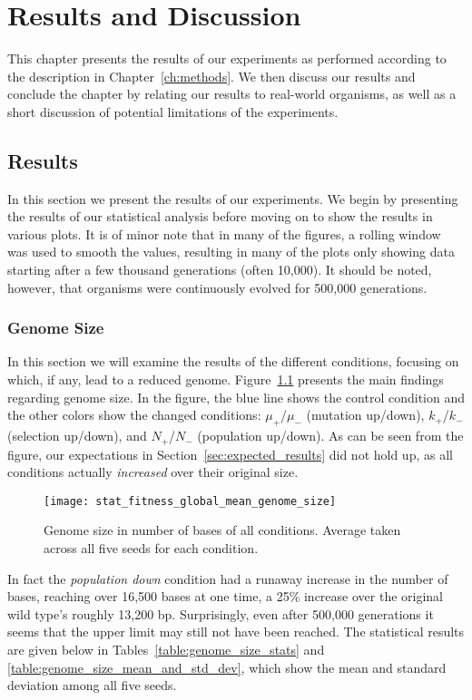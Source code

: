 \chapter{Results and Discussion}\label{ch:results_discussion}
This chapter presents the results of our experiments as performed according to the description in Chapter~\ref{ch:methods}. We then discuss our results and conclude the chapter by relating our results to real-world organisms, as well as a short discussion of potential limitations of the experiments.

\section{Results}\label{results}
In this section we present the results of our experiments. We begin by presenting the results of our statistical analysis before moving on to show the results in various plots. It is of minor note that in many of the figures, a rolling window was used to smooth the values, resulting in many of the plots only showing data starting after a few thousand generations (often 10,000). It should be noted, however, that organisms were continuously evolved for 500,000 generations. 

\subsection{Genome Size}\label{sec:genome_size}
In this section we will examine the results of the different conditions, focusing on which, if any, lead to a reduced genome. Figure~\ref{fig:genome_size} presents the main findings regarding genome size. In the figure, the blue line shows the control condition and the other colors show the changed conditions: $\mu_+$/$\mu_-$ (mutation up/down), $k_+$/$k_-$ (selection up/down), and $N_+$/$N_-$ (population up/down). As can be seen from the figure, our expectations in Section~\ref{sec:expected_results} did not hold up, as all conditions actually \textit{increased} over their original size.
\begin{figure}[H]
	\texttt{[image: stat\_fitness\_global\_mean\_genome\_size]}
	\centering
	\caption[Genome size]{Genome size in number of bases of all conditions. Average taken across all five seeds for each condition.}
	\label{fig:genome_size}
\end{figure}
In fact the \textit{population down} condition had a runaway increase in the number of bases, reaching over 16,500 bases at one time, a 25\% increase over the original wild type's roughly 13,200 bp. Surprisingly, even after 500,000 generations it seems that the upper limit may still not have been reached. The statistical results are given below in Tables~\ref{table:genome_size_stats} and \ref{table:genome_size_mean_and_std_dev}, which show the mean and standard deviation among all five seeds.

